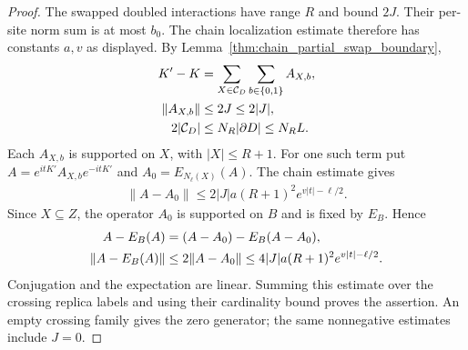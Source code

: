 \begin{proof}
    \leanok
    The swapped doubled interactions have range $R$ and bound $2J$.
    Their per-site norm sum is at most $b_0$. The chain localization
    estimate therefore has constants $a,v$ as displayed.
    By Lemma~\ref{thm:chain_partial_swap_boundary},
    \begin{align}
        K'-K            & =\sum_{X\in\mathcal C_D}\sum_{b\in\{0,1\}}A_{X,b},\notag \\
        \|A_{X,b}\|     & \le2J\le2|J|,\notag                                      \\
        2|\mathcal C_D| & \le N_R|\partial D|\le N_R L.
    \end{align}
    Each $A_{X,b}$ is supported on $X$, with $|X|\le R+1$.
    For one such term put $A=e^{itK'}A_{X,b}e^{-itK'}$ and
    $A_0=E_{N_\ell(X)}(A)$. The chain estimate gives
    \begin{align}
        \|A-A_0\|\le2|J|a(R+1)^2e^{v|t|-\ell/2}.
    \end{align}
    Since $X\subseteq Z$, the operator $A_0$ is supported on $B$ and is
    fixed by $E_B$. Hence
    \begin{align}
        A-E_B(A)     & =(A-A_0)-E_B(A-A_0),\notag \\
        \|A-E_B(A)\| & \le2\|A-A_0\|
        \le4|J|a(R+1)^2e^{v|t|-\ell/2}.
    \end{align}
    Conjugation and the expectation are linear. Summing this estimate
    over the crossing replica labels and using their cardinality
    bound proves the assertion. An empty crossing family gives the zero
    generator; the same nonnegative estimates include $J=0$.
\end{proof}


